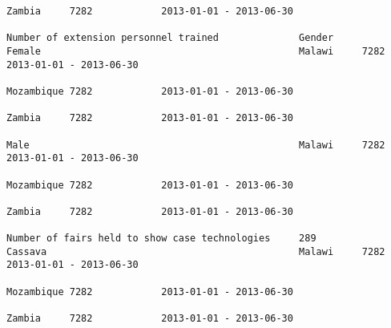 \documentclass[11pt]{article}
\begin{document}
\begin{Verbatim}[commandchars=\\\{\}]
                                                                                                                                                                                                                 Zambia     7282            2013-01-01 - 2013-06-30   
                                                                         Number of extension personnel trained              Gender                            Female                                             Malawi     7282            2013-01-01 - 2013-06-30   
                                                                                                                                                                                                                 Mozambique 7282            2013-01-01 - 2013-06-30   
                                                                                                                                                                                                                 Zambia     7282            2013-01-01 - 2013-06-30   
                                                                                                                                                              Male                                               Malawi     7282            2013-01-01 - 2013-06-30   
                                                                                                                                                                                                                 Mozambique 7282            2013-01-01 - 2013-06-30   
                                                                                                                                                                                                                 Zambia     7282            2013-01-01 - 2013-06-30   
                                                                         Number of fairs held to show case technologies     289                               Cassava                                            Malawi     7282            2013-01-01 - 2013-06-30   
                                                                                                                                                                                                                 Mozambique 7282            2013-01-01 - 2013-06-30   
                                                                                                                                                                                                                 Zambia     7282            2013-01-01 - 2013-06-30   

\end{Verbatim}
\end{document}
